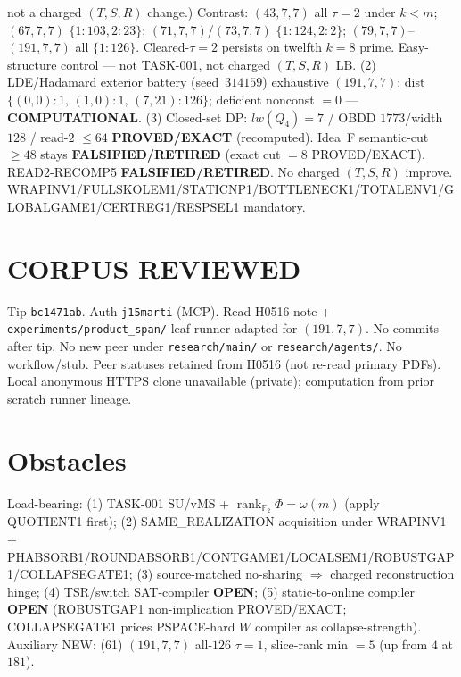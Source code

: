 \documentclass[11pt]{article}
\begin{document}
not a charged $(T,S,R)$ change.)
Contrast: $(43,7,7)$ all $\tau{=}2$ under $k{<}m$; $(67,7,7)$ $\{1{:}103,2{:}23\}$;
$(71,7,7)$/$(73,7,7)$ $\{1{:}124,2{:}2\}$; $(79,7,7)$--$(191,7,7)$ all $\{1{:}126\}$.
Cleared-$\tau{=}2$ persists on twelfth $k{=}8$ prime. Easy-structure control --- not TASK-001,
not charged $(T,S,R)$ LB.
(2) LDE/Hadamard exterior battery (seed~$314159$) exhaustive $(191,7,7)$:
dist $\{(0,0){:}1,\,(1,0){:}1,\,(7,21){:}126\}$; deficient nonconst $=0$ --- \textbf{COMPUTATIONAL}.
(3) Closed-set DP: $lw(Q_4)=7$ / OBDD $1773$/width $128$ / read-$2$ $\le64$
\textbf{PROVED/EXACT} (recomputed).
Idea~F semantic-cut $\ge48$ stays \textbf{FALSIFIED/RETIRED} (exact cut $=8$ PROVED/EXACT).
READ2-RECOMP5 \textbf{FALSIFIED/RETIRED}. No charged $(T,S,R)$ improve.
WRAPINV1/FULLSKOLEM1/STATICNP1/BOTTLENECK1/TOTALENV1/GLOBALGAME1/CERTREG1/RESPSEL1 mandatory.

\section*{CORPUS REVIEWED}
Tip \texttt{bc1471ab}. Auth \texttt{j15marti} (MCP). Read H0516 note +
\texttt{experiments/product\_span/} leaf runner adapted for $(191,7,7)$.
No commits after tip. No new peer under \texttt{research/main/} or \texttt{research/agents/}.
No workflow/stub. Peer statuses retained from H0516 (not re-read primary PDFs).
Local anonymous HTTPS clone unavailable (private); computation from prior scratch runner lineage.

\section*{Obstacles}
Load-bearing: (1) TASK-001 SU/vMS + $\operatorname{rank}_{\mathbb F_2}\Phi=\omega(m)$ (apply QUOTIENT1 first);
(2) SAME\_REALIZATION acquisition under WRAPINV1 + PHABSORB1/ROUNDABSORB1/CONTGAME1/LOCALSEM1/ROBUSTGAP1/COLLAPSEGATE1;
(3) source-matched no-sharing $\Rightarrow$ charged reconstruction hinge;
(4) TSR/switch SAT-compiler \textbf{OPEN};
(5) static-to-online compiler \textbf{OPEN} (ROBUSTGAP1 non-implication PROVED/EXACT;
COLLAPSEGATE1 prices PSPACE-hard $W$ compiler as collapse-strength).
Auxiliary NEW: (61) $(191,7,7)$ all-$126$ $\tau{=}1$, slice-rank min $=5$ (up from $4$ at $181$).
\end{document}

